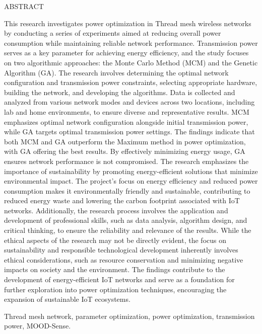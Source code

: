 \begin{center}
    ABSTRACT
\vspace{5mm} %
\end{center}

This research investigates power optimization in Thread mesh wireless networks by conducting a series of experiments aimed at reducing overall power consumption while maintaining reliable network performance. Transmission power serves as a key parameter for achieving energy efficiency, and the study focuses on two algorithmic approaches: the Monte Carlo Method (MCM) and the Genetic Algorithm (GA). The research involves determining the optimal network configuration and transmission power constraints, selecting appropriate hardware, building the network, and developing the algorithms. Data is collected and analyzed from various network modes and devices across two locations, including lab and home environments, to ensure diverse and representative results. MCM emphasizes optimal network configuration alongside initial transmission power, while GA targets optimal transmission power settings. The findings indicate that both MCM and GA outperform the Maximum method in power optimization, with GA offering the best results. By effectively minimizing energy usage, GA ensures network performance is not compromised. The research emphasizes the importance of sustainability by promoting energy-efficient solutions that minimize environmental impact. The project's focus on energy efficiency and reduced power consumption makes it environmentally friendly and sustainable, contributing to reduced energy waste and lowering the carbon footprint associated with IoT networks. Additionally, the research process involves the application and development of professional skills, such as data analysis, algorithm design, and critical thinking, to ensure the reliability and relevance of the results. While the ethical aspects of the research may not be directly evident, the focus on sustainability and responsible technological development inherently involves ethical considerations, such as resource conservation and minimizing negative impacts on society and the environment. The findings contribute to the development of energy-efficient IoT networks and serve as a foundation for further exploration into power optimization techniques, encouraging the expansion of sustainable IoT ecosystems.

\vspace{5mm} %
 Thread mesh network, parameter optimization, power optimization, transmission power, MOOD-Sense.  %
